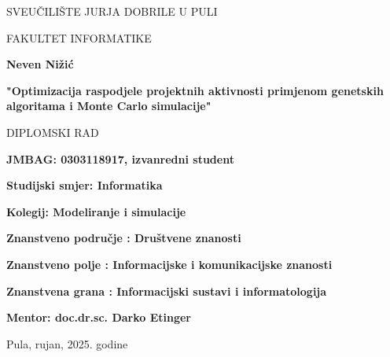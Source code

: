 \begin{center}
SVEUČILIŠTE JURJA DOBRILE U PULI 

FAKULTET INFORMATIKE

\vspace{45mm} 

\textbf{Neven Nižić}

\vspace{20mm} 

\textbf{"Optimizacija raspodjele projektnih aktivnosti primjenom genetskih algoritama i Monte Carlo simulacije"}

\vspace{5mm}
DIPLOMSKI RAD

\end{center}

\vspace{45mm}

\textbf{JMBAG: 0303118917, izvanredni student}

\textbf{Studijski smjer: Informatika}
\bigskip

\textbf{Kolegij: Modeliranje i simulacije}

\textbf{Znanstveno područje : Društvene znanosti}

\textbf{Znanstveno polje : Informacijske i komunikacijske znanosti}

\textbf{Znanstvena grana : Informacijski sustavi i informatologija}
\bigskip

\textbf{Mentor: doc.dr.sc. Darko Etinger}

\vfill

\begin{center}

Pula, rujan, 2025. godine

\end{center}
